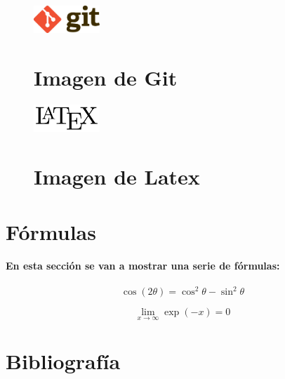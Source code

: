 \documentclass[a4paper,11pt]{article}
\begin{document}
\begin{figure} 
\centering
\includegraphics[width=25mm]{git.png}
\section{Imagen de Git}
\end{figure}


\begin{figure} 
\centering
\includegraphics[width=25mm]{LaTeX_logo.png}
\section{Imagen de Latex}
\end{figure}

\section*{Fórmulas}
\paragraph{En esta sección se van a mostrar una serie de fórmulas:}
$$\cos (2\theta)= \cos^2 \theta - \sin^2 \theta$$

$$\lim\limits_{x \to \infty} \exp(-x) = 0$$

\section*{Bibliografía}
\end{document}
